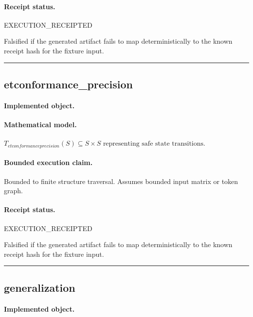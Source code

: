 \paragraph{Receipt status.} EXECUTION\_RECEIPTED
\begin{falsifier}
Falsified if the generated artifact fails to map deterministically to the known receipt hash for the fixture input.
\end{falsifier}

\vspace{1em}\hrule\vspace{1em}
\subsection{etconformance\_precision}
\paragraph{Implemented object.} 
\paragraph{Mathematical model.} $T_{etconformanceprecision}(S) \subseteq S \times S \text{ representing safe state transitions}.$
\paragraph{Bounded execution claim.} Bounded to finite structure traversal. Assumes bounded input matrix or token graph.
\paragraph{Receipt status.} EXECUTION\_RECEIPTED
\begin{falsifier}
Falsified if the generated artifact fails to map deterministically to the known receipt hash for the fixture input.
\end{falsifier}

\vspace{1em}\hrule\vspace{1em}
\subsection{generalization}
\paragraph{Implemented object.} 
